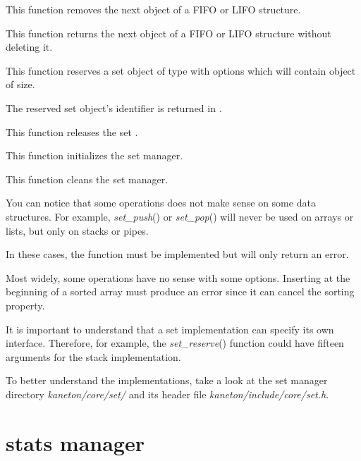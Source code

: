 	 {
	   This function removes the next object of a FIFO or LIFO structure.
	 }

	 {
	   This function returns the next object of a FIFO or LIFO structure
	   without deleting it.
	 }

	 {
	   This function reserves a set object of type 
	   with options  which will contain object of
	    size.

	   The reserved set object's identifier is returned in
	   .
	 }

	 {
	   This function releases the set .
	 }

	 {
	   This function initializes the set manager.
	 }

	 {
	   This function cleans the set manager.
	 }

You can notice that some operations does not make sense on some data
structures. For example, \textit{set\_push}() or \textit{set\_pop}()
will never be used on arrays or lists, but only on stacks or pipes.

In these cases, the function must be implemented but will only return
an error.

Most widely, some operations have no sense with some options. Inserting
at the beginning of a sorted array must produce an error since it can
cancel the sorting property.

It is important to understand that a set implementation can specify
its own interface. Therefore, for example, the \textit{set\_reserve}()
function could have fifteen arguments for the stack implementation.

To better understand the implementations, take a look at the set
manager directory \textit{kaneton/core/set/} and its header file
\textit{kaneton/include/core/set.h}.

%
%

\section{stats manager}

